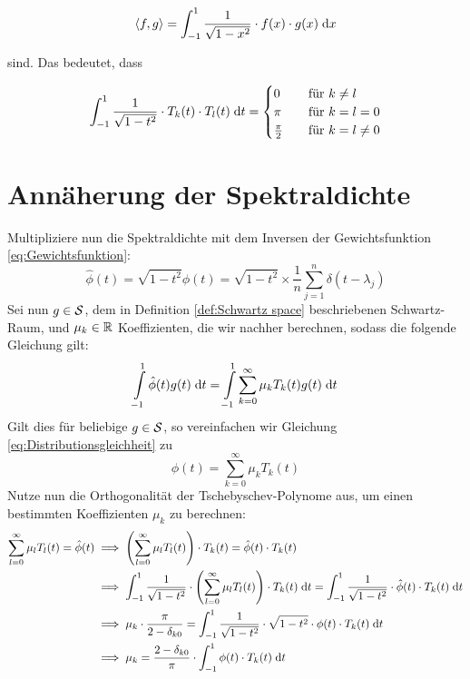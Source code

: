 $$\left \langle f, g \right \rangle = \int_{-1}^1 \frac{1}{\sqrt{1 - x^2}} \cdot f(x) \cdot g(x) \;\mathrm{d}x$$

sind. Das bedeutet, dass

$$\int_{-1}^1 \frac{1}{\sqrt{1 - t^2}} \cdot T_k(t) \cdot T_l(t) \;\mathrm{d}t =
\begin{cases}
    0               & \quad \text{für } k \neq l\\
    \pi             & \quad \text{für } k = l = 0\\
    \frac{\pi}{2}   & \quad \text{für } k = l \neq 0
\end{cases}$$

\section{Annäherung der Spektraldichte}
Multipliziere nun die Spektraldichte mit dem Inversen der Gewichtsfunktion \ref{eq:Gewichtsfunktion}:
$$\hat{\phi}(t) = \sqrt{1 - t^2} \phi(t) = \sqrt{1 - t^2} \times \frac{1}{n} \sum_{j = 1}^n \delta(t - \lambda_j)$$
Sei nun $g \in \mathcal{S}$, dem in Definition \ref{def:Schwartz space} beschriebenen Schwartz-Raum,
und $\mu_k \in \mathbb{R}$ Koeffizienten,
die wir nachher berechnen, sodass die folgende Gleichung gilt:
\begin{equation} \label{eq:Distributionsgleichheit}
    \int \limits_{-1}^1 \hat{\phi}(t) g(t) \;\mathrm{d}t = \int \limits_{-1}^1 \sum_{k = 0}^{\infty} \mu_k T_k(t) g(t) \;\mathrm{d}t
\end{equation}
Gilt dies für beliebige $g \in \mathcal{S}$, so vereinfachen wir Gleichung \ref{eq:Distributionsgleichheit} zu
\begin{equation} \label{eq:Tschebyschev-Erweiterung}
    \hat{\phi}(t) = \sum_{k = 0}^{\infty} \mu_k T_k(t)
\end{equation}
Nutze nun die Orthogonalität der Tschebyschev-Polynome aus, um einen bestimmten Koeffizienten $\mu_k$ zu berechnen:
\begin{align*}
    \sum_{l = 0}^{\infty} \mu_l T_l(t) = \hat{\phi}(t) & \implies \left(\sum_{l = 0}^{\infty} \mu_l T_l(t)\right) \cdot T_k(t) = \hat{\phi}(t) \cdot T_k(t)\\
    & \implies \int_{-1}^1 \frac{1}{\sqrt{1 - t^2}} \cdot \left(\sum_{l = 0}^{\infty} \mu_l T_l(t)\right) \cdot T_k(t) \;\mathrm{d}t = \int_{-1}^1 \frac{1}{\sqrt{1 - t^2}} \cdot \hat{\phi}(t) \cdot T_k(t) \;\mathrm{d}t\\
    & \implies \mu_k \cdot \frac{\pi}{2 - \delta_{k0}} = \int_{-1}^1 \frac{1}{\sqrt{1 - t^2}} \cdot \sqrt{1 - t^2} \cdot \phi(t) \cdot T_k(t) \;\mathrm{d}t\\
    & \implies \mu_k = \frac{2 - \delta_{k0}}{\pi} \cdot \int_{-1}^1 \phi(t) \cdot T_k(t) \;\mathrm{d}t\\
\end{align*}

